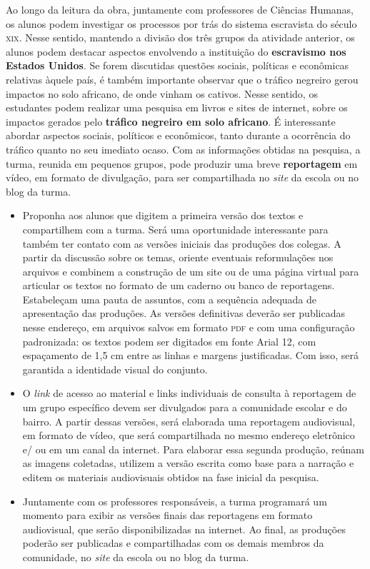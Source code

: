 \documentclass[11pt]{extarticle}
\begin{document}
Ao longo da leitura da obra, juntamente com professores de Ciências
Humanas, os alunos podem investigar os processos por trás do sistema
escravista do século \textsc{xix}. Nesse sentido, mantendo a divisão dos três
grupos da atividade anterior, os alunos podem destacar aspectos
envolvendo a instituição do \textbf{escravismo nos Estados Unidos}. Se
forem discutidas questões sociais, políticas e econômicas relativas
àquele país, é também importante observar que o tráfico negreiro gerou
impactos no solo africano, de onde vinham os cativos. Nesse sentido, os
estudantes podem realizar uma pesquisa em livros e sites de internet,
sobre os impactos gerados pelo \textbf{tráfico negreiro em solo
africano}. É interessante abordar aspectos sociais, políticos e
econômicos, tanto durante a ocorrência do tráfico quanto no seu imediato
ocaso. Com as informações obtidas na pesquisa, a turma, reunida em
pequenos grupos, pode produzir uma breve \textbf{reportagem} em vídeo,
em formato de divulgação, para ser compartilhada no \emph{site} da
escola ou no blog da turma.


\begin{itemize}
\item
  Proponha aos alunos que digitem a primeira versão dos textos e
  compartilhem com a turma. Será uma oportunidade interessante para
  também ter contato com as versões iniciais das produções dos colegas.
  A partir da discussão sobre os temas, oriente eventuais reformulações
  nos arquivos e combinem a construção de um site ou de uma página
  virtual para articular os textos no formato de um caderno ou banco de
  reportagens. Estabeleçam uma pauta de assuntos, com a sequência
  adequada de apresentação das produções. As versões definitivas deverão
  ser publicadas nesse endereço, em arquivos salvos em formato \textsc{pdf} e com
  uma configuração padronizada: os textos podem ser digitados em fonte
  Arial 12, com espaçamento de 1,5 cm entre as linhas e margens
  justificadas. Com isso, será garantida a identidade visual do
  conjunto.
\item
  O \emph{link} de acesso ao material e links individuais de consulta à
  reportagem de um grupo específico devem ser divulgados para a
  comunidade escolar e do bairro. A partir dessas versões, será
  elaborada uma reportagem audiovisual, em formato de vídeo, que será
  compartilhada no mesmo endereço eletrônico e/ ou em um canal da
  internet. Para elaborar essa segunda produção, reúnam as imagens
  coletadas, utilizem a versão escrita como base para a narração e
  editem os materiais audiovisuais obtidos na fase inicial da pesquisa.
\item
  Juntamente com os professores responsáveis, a turma programará um
  momento para exibir as versões finais das reportagens em formato
  audiovisual, que serão disponibilizadas na internet. Ao final, as
  produções poderão ser publicadas e compartilhadas com os demais
  membros da comunidade, no \emph{site} da escola ou no blog da turma.
\end{itemize}
\end{document}
